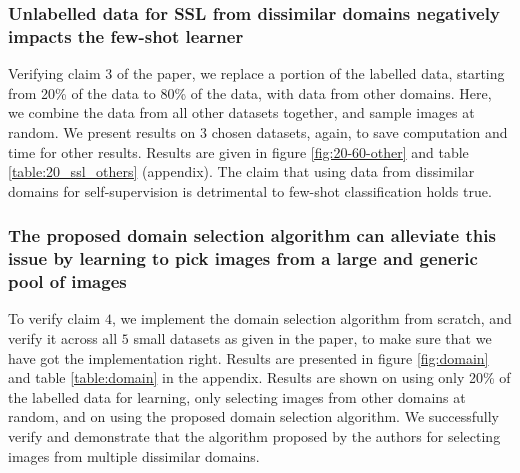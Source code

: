 \subsubsection{Unlabelled data for SSL from dissimilar domains negatively impacts the few-shot learner}

Verifying claim $3$ of the paper, we replace a portion of the labelled data, starting from 20\% of the data to 80\% of the data, with data from other domains. Here, we combine the data from all other datasets together, and sample images at random. We present results on $3$ chosen datasets, again, to save computation and time for other results. Results are given in figure \ref{fig:20-60-other} and table \ref{table:20_ssl_others} (appendix). The claim that using data from dissimilar domains for self-supervision is detrimental to few-shot classification holds true.



\subsubsection{The proposed domain selection algorithm can alleviate this issue by learning to pick images from a large and generic pool of images}

To verify claim $4$, we implement the domain selection algorithm from scratch, and verify it across all $5$ small datasets as given in the paper, to make sure that we have got the implementation right. Results are presented in figure \ref{fig:domain} and table \ref{table:domain} in the appendix. Results are shown on using only 20\% of the labelled data for learning, only selecting images from other domains at random, and on using the proposed domain selection algorithm. We successfully verify and demonstrate that the algorithm proposed by the authors for selecting images from multiple dissimilar domains.

    
